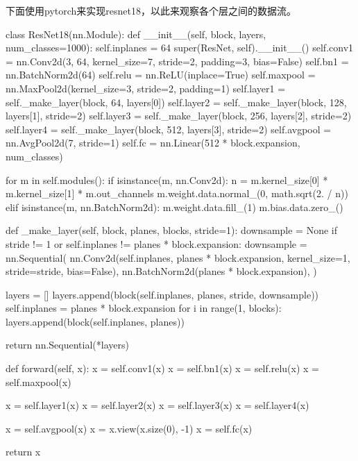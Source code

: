 下面使用pytorch来实现resnet18，以此来观察各个层之间的数据流。
\begin{codeblock}[language=python]
class ResNet18(nn.Module):
    def __init__(self, block, layers, num_classes=1000):
        self.inplanes = 64
        super(ResNet, self).__init__()
        self.conv1 = nn.Conv2d(3, 64, kernel_size=7, stride=2, padding=3,
                               bias=False)
        self.bn1 = nn.BatchNorm2d(64)
        self.relu = nn.ReLU(inplace=True)
        self.maxpool = nn.MaxPool2d(kernel_size=3, stride=2, padding=1)
        self.layer1 = self._make_layer(block, 64, layers[0])
        self.layer2 = self._make_layer(block, 128, layers[1], stride=2)
        self.layer3 = self._make_layer(block, 256, layers[2], stride=2)
        self.layer4 = self._make_layer(block, 512, layers[3], stride=2)
        self.avgpool = nn.AvgPool2d(7, stride=1)
        self.fc = nn.Linear(512 * block.expansion, num_classes)

        for m in self.modules():
            if isinstance(m, nn.Conv2d):
                n = m.kernel_size[0] * m.kernel_size[1] * m.out_channels
                m.weight.data.normal_(0, math.sqrt(2. / n))
            elif isinstance(m, nn.BatchNorm2d):
                m.weight.data.fill_(1)
                m.bias.data.zero_()

    def _make_layer(self, block, planes, blocks, stride=1):
        downsample = None
        if stride != 1 or self.inplanes != planes * block.expansion:
            downsample = nn.Sequential(
                nn.Conv2d(self.inplanes, planes * block.expansion,
                          kernel_size=1, stride=stride, bias=False),
                nn.BatchNorm2d(planes * block.expansion),
            )

        layers = []
        layers.append(block(self.inplanes, planes, stride, downsample))
        self.inplanes = planes * block.expansion
        for i in range(1, blocks):
            layers.append(block(self.inplanes, planes))

        return nn.Sequential(*layers)

    def forward(self, x):
        x = self.conv1(x)
        x = self.bn1(x)
        x = self.relu(x)
        x = self.maxpool(x)

        x = self.layer1(x)
        x = self.layer2(x)
        x = self.layer3(x)
        x = self.layer4(x)

        x = self.avgpool(x)
        x = x.view(x.size(0), -1)
        x = self.fc(x)

        return x

\end{codeblock}


